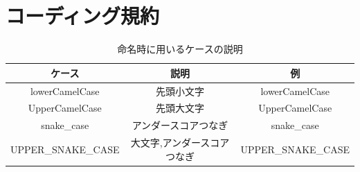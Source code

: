 \section{コーディング規約}
\begin{table}[H]
  \centering
  \caption{命名時に用いるケースの説明}
  \label{tab:code-case}
  \begin{tabular}{|c|c|c|} \hline
    ケース                & 説明             & 例                  \\ \hline \hline
    lowerCamelCase     & 先頭小文字          & lowerCamelCase     \\ \hline
    UpperCamelCase     & 先頭大文字          & UpperCamelCase     \\ \hline
    snake\_case        & アンダースコアつなぎ     & snake\_case        \\ \hline
    UPPER\_SNAKE\_CASE & 大文字,アンダースコアつなぎ & UPPER\_SNAKE\_CASE \\ \hline
  \end{tabular}
\end{table}

